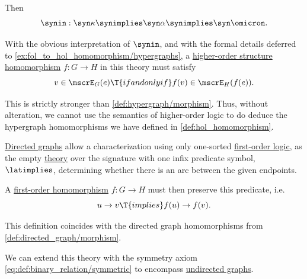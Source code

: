 \begin{remark}
\begin{thmenum}
    Then
    \begin{equation*}
      \synin: \syn\kappa \synimplies \syn\alpha \synimplies \syn\omicron.
    \end{equation*}

    With the obvious interpretation of \( \synin \), and with the formal details deferred to \cref{ex:fol_to_hol_homomorphism/hypergraphs}, a \hyperref[def:hol_homomorphism]{higher-order structure homomorphism} \( f: G \to H \) in this theory must satisfy
    \begin{equation*}
      v \in \mscrE_G(e) \T{if and only if} f(v) \in \mscrE_H(f(e)).
    \end{equation*}

    This is strictly stronger than \cref{def:hypergraph/morphism}. Thus, without alteration, we cannot use the semantics of higher-order logic to do deduce the hypergraph homomorphisms we have defined in \cref{def:hol_homomorphism}.

     \hyperref[def:directed_graph]{Directed graphs} allow a characterization using only one-sorted \hyperref[def:first_order_logic]{first-order logic}, as the empty \hyperref[def:fol_theory]{theory} over the signature with one infix predicate symbol, \( {\latimplies} \), determining whether there is an arc between the given endpoints.

    A \hyperref[def:fol_homomorphism]{first-order homomorphism} \( f: G \to H \) must then preserve this predicate, i.e.
    \begin{equation*}
      u \to v \T{implies} f(u) \to f(v).
    \end{equation*}

    This definition coincides with the directed graph homomorphisms from \cref{def:directed_graph/morphism}.

     We can extend this theory with the symmetry axiom \eqref{eq:def:binary_relation/symmetric} to encompass \hyperref[def:undirected_graph]{undirected graphs}.
  \end{thmenum}
\end{remark}

